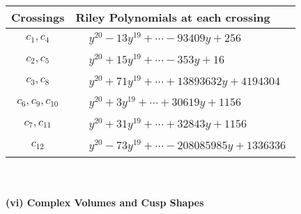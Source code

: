 \documentclass[1p]{elsarticle_modified}
\theoremstyle{definition}
\begin{document}
\begin{tabular}{m{50pt}|m{274pt}}
Crossings & \hspace{64pt}Riley Polynomials at each crossing \\
\hline $$\begin{aligned}c_{1},c_{4}\end{aligned}$$&$\begin{aligned}
&y^{20}-13 y^{19}+\cdots-93409 y+256
\end{aligned}$\\
\hline $$\begin{aligned}c_{2},c_{5}\end{aligned}$$&$\begin{aligned}
&y^{20}+15 y^{19}+\cdots-353 y+16
\end{aligned}$\\
\hline $$\begin{aligned}c_{3},c_{8}\end{aligned}$$&$\begin{aligned}
&y^{20}+71 y^{19}+\cdots+13893632 y+4194304
\end{aligned}$\\
\hline $$\begin{aligned}c_{6},c_{9},c_{10}\end{aligned}$$&$\begin{aligned}
&y^{20}+3 y^{19}+\cdots+30619 y+1156
\end{aligned}$\\
\hline $$\begin{aligned}c_{7},c_{11}\end{aligned}$$&$\begin{aligned}
&y^{20}+31 y^{19}+\cdots+32843 y+1156
\end{aligned}$\\
\hline $$\begin{aligned}c_{12}\end{aligned}$$&$\begin{aligned}
&y^{20}-73 y^{19}+\cdots-208085985 y+1336336
\end{aligned}$\\
\hline
\end{tabular}\\~\\
\newpage\flushleft \textbf{(vi) Complex Volumes and Cusp Shapes}
\end{document}
